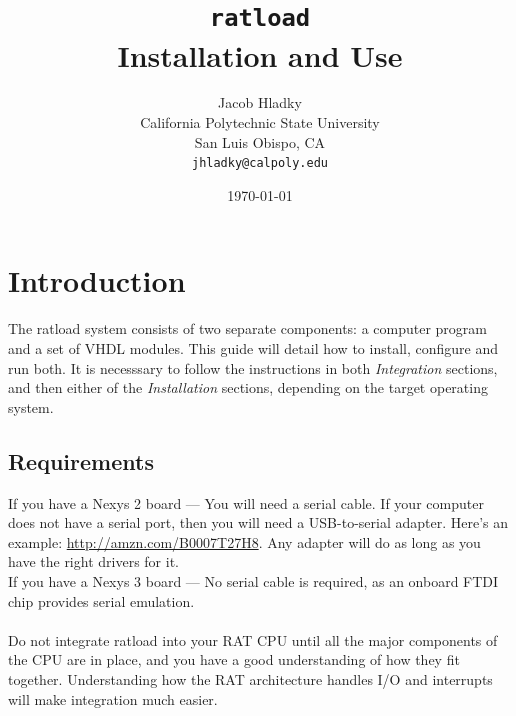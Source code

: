 \documentclass[notitlepage]{article}
\makeatletter
\newcommand*{\toccontents}{\@starttoc{toc}}
\makeatother
\begin{document}
\title{\huge{\texttt{ratload}\\ Installation and Use}}
\author{
  Jacob Hladky\\
  California Polytechnic State University\\
  San Luis Obispo, CA\\
  \texttt{jhladky@calpoly.edu}
}
\date{\today}
\maketitle

\toccontents


\section{Introduction}
The ratload system consists of two separate components: a computer program and a set of VHDL modules. This guide will detail how to install, configure and run both. It is necesssary to follow the instructions in both \emph{Integration} sections, and then either of the \emph{Installation} sections, depending on the target operating system.

\subsection{Requirements}
If you have a Nexys 2 board --- You will need a serial cable. If your computer does not have a serial port, then you will need a USB-to-serial adapter. Here's an example: \url{http://amzn.com/B0007T27H8}. Any adapter will do as long as you have the right drivers for it.\\
If you have a Nexys 3 board --- No serial cable is required, as an onboard FTDI chip provides serial emulation.\\\\
Do not integrate ratload into your RAT CPU until all the major components of the CPU are in place, and you have a good understanding of how they fit together. Understanding how the RAT architecture handles I/O and interrupts will make integration much easier.
\end{document}
